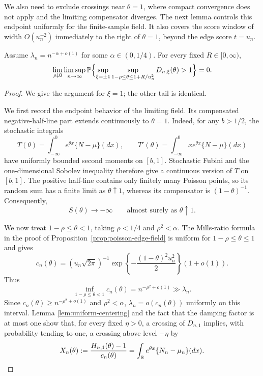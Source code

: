 We also need to exclude crossings near \(\theta=1\), where compact
convergence does not apply and the limiting compensator diverges. The next
lemma controls this endpoint uniformly for the finite-sample field. It also
covers the score window of width \(O(u_n^{-2})\) immediately to the right of
\(\theta=1\), beyond the edge score \(t=u_n\).

\begin{lemma}
\label{lem:endpoint-exclusion}
Assume $\lambda_n=n^{-\alpha+o(1)}$ for some $\alpha\in(0,1/4)$. For every fixed $R\in[0,\infty)$,
\[
    \lim_{\rho\downarrow0}\limsup_{n\to\infty}
    \mathbb P\Bigl\{
        \sup_{\xi=\pm1}
        \sup_{1-\rho\le\theta\le1+R/u_n^2}
        D_{n,\xi}(\theta)>1
    \Bigr\}
    =
    0.
\]
\end{lemma}

\begin{proof}
We give the argument for $\xi=1$; the other tail is identical.

We first record the endpoint behavior of the limiting field. Its compensated
negative-half-line part extends continuously to \(\theta=1\). Indeed, for any
\(b>1/2\), the stochastic integrals
\[
 T(\theta)=\int_{-\infty}^0e^{\theta x}\{N-\mu\}(dx),
 \qquad
 T'(\theta)=\int_{-\infty}^0xe^{\theta x}\{N-\mu\}(dx)
\]
have uniformly bounded second moments on \([b,1]\). Stochastic Fubini and the
one-dimensional Sobolev inequality therefore give a continuous version of
\(T\) on \([b,1]\). The positive half-line contains only finitely many
Poisson points, so its random sum has a finite limit as \(\theta\uparrow1\),
whereas its compensator is \((1-\theta)^{-1}\). Consequently,
\begin{equation}
\label{eq:poisson-field-right-endpoint}
 S(\theta)\longrightarrow-\infty
 \qquad\text{almost surely as }\theta\uparrow1.
\end{equation}

We now treat $1-\rho\le\theta<1$, taking \(\rho<1/4\) and
\(\rho^2<\alpha\). The Mills-ratio formula in the proof of
Proposition~\ref{prop:poisson-edge-field} is uniform for
$1-\rho\le\theta\le1$ and gives
\[
    c_n(\theta)
    =
    (u_n\sqrt{2\pi})^{-1}
    \exp\!\left\{
        -\frac{(1-\theta)^2u_n^2}{2}
    \right\}(1+o(1)).
\]
Thus
\[
    \inf_{1-\rho\le\theta<1}c_n(\theta)
    =
    n^{-\rho^2+o(1)}
    \gg \lambda_n.
\]
Since \(c_n(\theta)\ge n^{-\rho^2+o(1)}\) and \(\rho^2<\alpha\),
    \(\lambda_n=o(c_n(\theta))\) uniformly on this interval. Lemma
    \ref{lem:uniform-centering} and the fact that the damping factor is at most
one show that, for every fixed \(\eta>0\), a crossing of \(D_{n,1}\) implies,
with probability tending to one, a crossing above level \(-\eta\) by
\[
    X_n(\theta)
    :=
    \frac{H_{n,1}(\theta)-1}{c_n(\theta)}
    =
    \int_{\mathbb{R}} e^{\theta x}\{N_n-\mu_n\}(dx).
\]


\end{proof}
